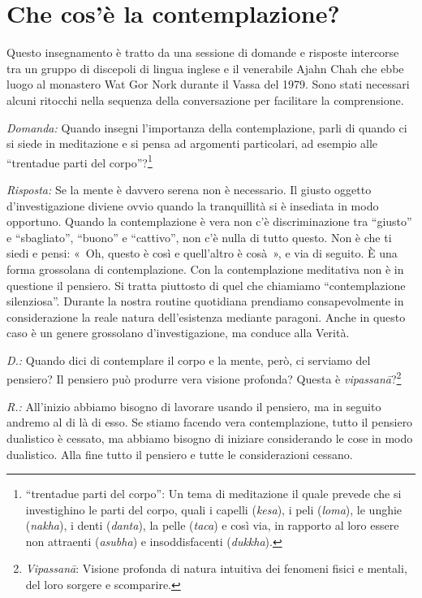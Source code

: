 \chapter{Che cos'è la contemplazione?}

\begin{openingQuote}
  \centering

  Questo insegnamento è tratto da una sessione di domande e risposte intercorse
  tra un gruppo di discepoli di lingua inglese e il venerabile Ajahn Chah che
  ebbe luogo al monastero Wat Gor Nork durante il Vassa del 1979. Sono stati
  necessari alcuni ritocchi nella sequenza della conversazione per facilitare la
  comprensione.
\end{openingQuote}

\emph{Domanda:} Quando insegni l'importanza della contemplazione, parli di
quando ci si siede in meditazione e si pensa ad argomenti particolari,
ad esempio alle ``trentadue parti del
corpo''?\footnote{``trentadue parti del corpo'': Un
  tema di meditazione il quale prevede che si investighino le parti del
  corpo, quali i capelli (\emph{kesa}), i peli (\emph{loma}), le unghie
  (\emph{nakha}), i denti (\emph{danta}), la pelle (\emph{taca}) e così
  via, in rapporto al loro essere non attraenti (\emph{asubha}) e
  insoddisfacenti (\emph{dukkha}).}

\emph{Risposta:} Se la mente è davvero serena non è necessario. Il giusto
oggetto d'investigazione diviene ovvio quando la tranquillità si è
insediata in modo opportuno. Quando la contemplazione è vera non c'è
discriminazione tra ``giusto'' e ``sbagliato'', ``buono'' e ``cattivo'',
non c'è nulla di tutto questo. Non è che ti siedi e pensi: «~Oh, questo
è così e quell'altro è cosà~», e via di seguito. È una forma grossolana
di contemplazione. Con la contemplazione meditativa non è in questione
il pensiero. Si tratta piuttosto di quel che chiamiamo ``contemplazione
silenziosa''. Durante la nostra routine quotidiana prendiamo
consapevolmente in considerazione la reale natura dell'esistenza
mediante paragoni. Anche in questo caso è un genere grossolano
d'investigazione, ma conduce alla Verità.

\emph{D.:} Quando dici di contemplare il corpo e la mente, però, ci serviamo
del pensiero? Il pensiero può produrre vera visione profonda? Questa è
\emph{vipassanā}?\footnote{\emph{Vipassanā}: Visione
  profonda di natura intuitiva dei fenomeni fisici e mentali, del loro
  sorgere e scomparire.}

\emph{R.:} All'inizio abbiamo bisogno di lavorare usando il pensiero, ma in
seguito andremo al di là di esso. Se stiamo facendo vera contemplazione,
tutto il pensiero dualistico è cessato, ma abbiamo bisogno di iniziare
considerando le cose in modo dualistico. Alla fine tutto il pensiero e
tutte le considerazioni cessano.

